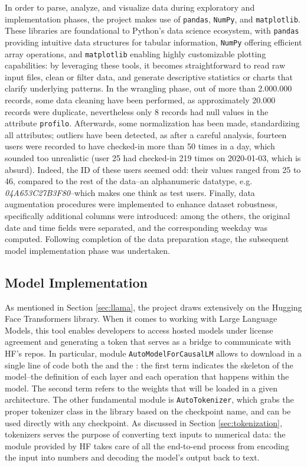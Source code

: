 In order to parse, analyze, and visualize data during exploratory and implementation phases, the project makes use of \verb|pandas|, \verb|NumPy|, and \verb|matplotlib|. These libraries are foundational to Python’s data science ecosystem, with \verb|pandas| providing intuitive data structures for tabular information, \verb|NumPy| offering efficient array operations, and \verb|matplotlib| enabling highly customizable plotting capabilities: by leveraging these tools, it becomes straightforward to read raw input files, clean or filter data, and generate descriptive statistics or charts that clarify underlying patterns.
In the wrangling phase, out of more than 2.000.000 records, some data cleaning have been performed, as approximately 20.000 records were duplicate, nevertheless only 8 records had null values in the attribute \verb|profilo|. Afterwards, some normalization has been made, standardizing all attributes; outliers have been detected, as after a careful analysis, fourteen users were recorded to have checked-in more than 50 times in a day, which sounded too unrealistic (user 25 had checked-in 219 times on 2020-01-03, which is absurd). Indeed, the ID of these users seemed odd: their values ranged from 25 to 46, compared to the rest of the data--an alphanumeric datatype, e.g. \textit{04A653C27B3F80}--which makes one think as test users. Finally, data augmentation procedures were implemented to enhance dataset robustness, specifically additional columns were introduced: among the others, the original date and time fields were separated, and the corresponding weekday was computed.
Following completion of the data preparation stage, the subsequent model implementation phase was undertaken.


\subsection{Model Implementation}
\label{sec:model-implementation}

As mentioned in Section \ref{sec:llama}, the project draws extensively on the Hugging Face Transformers library. When it comes to working with Large Language Models, this tool enables developers to access hosted models under license agreement and generating a token that serves as a bridge to communicate with HF's repos. In particular, module \verb|AutoModelForCausalLM| allows to download in a single line of code both the  and the : the first term indicates the skeleton of the model--the definition of each layer and each operation that happens within the model. The second term refers to the weights that will be loaded in a given architecture.
The other fundamental module is \verb|AutoTokenizer|, which grabs the proper tokenizer class in the library based on the checkpoint name, and can be used directly with any checkpoint. As discussed in Section \ref{sec:tokenization}, tokenizers serves the purpose of converting text inputs to numerical data: the module provided by HF takes care of all the end-to-end process from encoding the input into numbers and decoding the model's output back to text.

